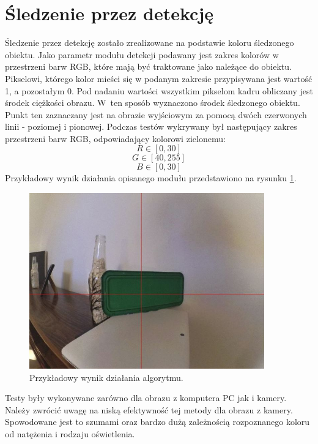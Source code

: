 \section{Śledzenie przez detekcję}
\label{sec:sledzenieprzezdetekcje}

Śledzenie przez detekcję zostało zrealizowane na podstawie koloru śledzonego obiektu. 
Jako parametr modułu detekcji podawany jest zakres kolorów w przestrzeni barw RGB, które mają być traktowane jako należące do obiektu. 
Pikselowi, którego kolor mieści się w podanym zakresie przypisywana jest wartość 1, a pozostałym 0. 
Pod nadaniu wartości wszystkim pikselom kadru obliczany jest środek ciężkości obrazu. 
W~ten sposób wyznaczono środek śledzonego obiektu. 
Punkt ten zaznaczany jest na obrazie wyjściowym za pomocą dwóch czerwonych linii - poziomej i pionowej. 
Podczas testów wykrywany był następujący zakres przestrzeni barw RGB, odpowiadający kolorowi zielonemu:
\begin{equation}
R \in [0,30]
\end{equation}
\begin{equation}
G \in [40,255]
\end{equation}
\begin{equation}
B \in [0,30]
\end{equation}
Przykładowy wynik działania opisanego modułu przedstawiono na rysunku \ref{fig:detekcja}.

\begin{figure}[H]
	\centering
	\includegraphics[width=4in]{detekcja.jpg}
	\caption{Przykładowy wynik działania algorytmu.}
	\label{fig:detekcja}
\end{figure}

Testy były wykonywane zarówno dla obrazu z komputera PC jak i kamery. 
Należy zwrócić uwagę na niską efektywność tej metody dla obrazu z kamery. 
Spowodowane jest to szumami oraz bardzo dużą zależnością rozpoznanego koloru od natężenia i rodzaju oświetlenia.

